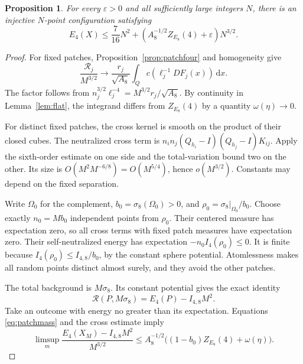 \documentclass[11pt,a4paper]{article}
\newtheorem{proposition}[theorem]{Proposition}
\theoremstyle{definition}
\newcommand{\dd}{\,\mathrm d}
\newcommand{\eps}{\varepsilon}
\numberwithin{equation}{section}
\begin{document}
\begin{proposition}\label{prop:upperfour}
For every $\eps>0$ and all sufficiently large integers $N$, there is an injective $N$-point configuration satisfying
\begin{equation}\label{eq:upperfour}
 E_4(X)\le\frac7{16}N^2+
            \left(A_8^{-1/2}Z_{E_8}(4)+\eps\right)N^{3/2}.
\end{equation}
\end{proposition}
\begin{proof}
For fixed patches, Proposition~\ref{prop:patchfour} and homogeneity give
\begin{equation}\label{eq:patchmass}
 \frac{\mathscr R_j}{M^{3/2}}\longrightarrow
 \frac{r_j}{\sqrt{A_8}}\int_Qc(\ell_j^{-1}DF_j(x))\dd x.
\end{equation}
The factor follows from $n_j^{3/2}\ell_j^{-4}=M^{3/2}r_j/\sqrt{A_8}$. By continuity in Lemma~\ref{lem:flat}, the integrand differs from $Z_{E_8}(4)$ by a quantity $\omega(\eta)\to0$.

For distinct fixed patches, the cross kernel is smooth on the product of their closed cubes. The neutralized cross term is
$n_in_j(Q_{h_i}-I)(Q_{h_j}-I)K_{ij}$. Apply the sixth-order estimate on one side and the total-variation bound two on the other. Its size is $O(M^2M^{-6/8})=O(M^{5/4})$, hence $o(M^{3/2})$. Constants may depend on the fixed separation.

Write $\Omega_0$ for the complement, $b_0=\sigma_8(\Omega_0)>0$, and $\rho_0=\sigma_8|_{\Omega_0}/b_0$. Choose exactly $n_0=Mb_0$ independent points from $\rho_0$. Their centered measure has expectation zero, so all cross terms with fixed patch measures have expectation zero. Their self-neutralized energy has expectation $-n_0I_4(\rho_0)\le0$. It is finite because
$I_4(\rho_0)\le I_{4,8}/b_0$, by the constant sphere potential. Atomlessness makes all random points distinct almost surely, and they avoid the other patches.

The total background is $M\sigma_8$. Its constant potential gives the exact identity
\begin{equation}
 \mathscr R(P,M\sigma_8)=E_4(P)-I_{4,8}M^2.
\end{equation}
Take an outcome with energy no greater than its expectation. Equations \eqref{eq:patchmass} and the cross estimate imply
\begin{equation}\label{eq:subsequpper}
 \limsup_m\frac{E_4(X_M)-I_{4,8}M^2}{M^{3/2}}
 \le A_8^{-1/2}\bigl((1-b_0)Z_{E_8}(4)+\omega(\eta)\bigr).
\end{equation}


\end{proof}
\end{document}
